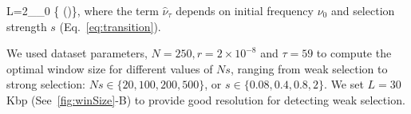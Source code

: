\beq L=2\min_{\nu_0} \left\{
  \log\left(\right)\right\},
  \label{eq:winSize}
\eeq 
where the term $\hat{\nu}_\tau$ depends on initial frequency
$\nu_0$ and selection strength $s$ (Eq.~\ref{eq:transition}).


We used \dmel dataset parameters, $N=250,r=2\times10^{-8}$ and
$\tau=59$ to compute the optimal window size for different values of
$Ns$, ranging from weak selection to strong selection:
$Ns\in\{20,100,200,500\}$, or $s\in\{0.08,0.4,0.8,2\}$.  We set
$L=30$Kbp (See~\ref{fig:winSize}-B) to provide good resolution for
detecting weak selection.








